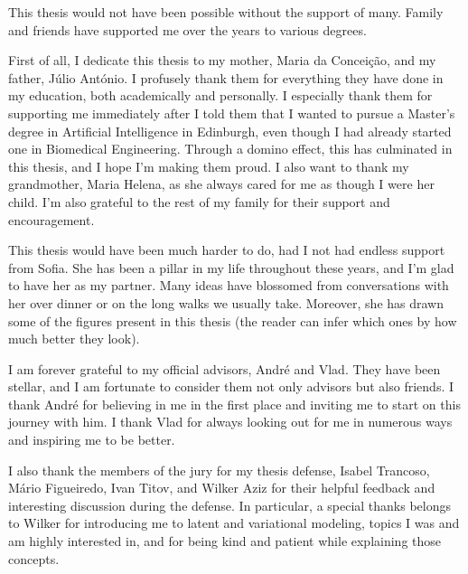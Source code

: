 \begin{acknowledgments}

    This thesis would not have been possible without the support of
    many. Family and friends have supported me over
    the years to various degrees.
    
    First of all, I dedicate this thesis to my mother, Maria da
    Conceição, and my father, Júlio António. I profusely thank them
    for everything they have done in my education, both academically
    and personally. I especially thank them for supporting me
    immediately after I told them that I wanted to pursue a Master's
    degree in Artificial Intelligence in Edinburgh, even though I had
    already started one in Biomedical Engineering. Through a domino
    effect, this has culminated in this thesis, and I hope I'm making
    them proud. I also want to thank my grandmother, Maria Helena, as she
    always cared for me as though I were her child. I'm also grateful
    to the rest of my family for their support and encouragement.
    
    This thesis would have been much harder to do, had I not had
    endless support from Sofia. She has been a pillar in my life
    throughout these years, and I'm glad to have her as my partner.
    Many ideas have blossomed from conversations with her over dinner
    or on the long walks we usually take. Moreover, she has drawn
    some of the figures present in this thesis (the reader can infer
    which ones by how much better they look).
    
    I am forever grateful to my official advisors, André and Vlad. They
    have been stellar, and I am fortunate to consider them not only
    advisors but also friends. I thank André for believing in me in
    the first place and inviting me to start on this journey with
    him. I thank Vlad for always looking out for me in numerous ways
    and inspiring me to be better.
    
    I also thank the members of the jury for my thesis defense,
    Isabel Trancoso, Mário Figueiredo, Ivan Titov, and Wilker Aziz
    for their helpful feedback and interesting discussion during the
    defense. In particular, a special thanks belongs to Wilker for
    introducing me to latent and variational modeling, topics I was
    and am highly interested in, and for being kind and patient while
    explaining those concepts.
    

\end{acknowledgments}

